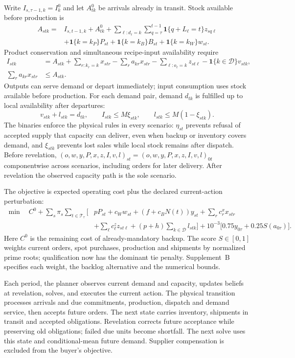 \documentclass[preprint,11pt,authoryear]{elsarticle}
\begin{document}
Write $I_{s,\tau-1,k}=I^0_k$ and let $A^0_{tk}$ be arrivals already in transit. Stock available before production is
\begin{align}
A_{stk}={}&I_{s,t-1,k}+A^0_{tk}
 +\sum_{\ell:d_\ell=k}\sum_{q=\tau}^{t-1}\mathbf1\{q+L_\ell=t\}z_{sq\ell}\nonumber\\
 &+\mathbf1\{k=k_P\}P_{st}+\mathbf1\{k=k_B\}B_{st}+\mathbf1\{k=k_W\}w_{st}.\label{eq:article_arrivals}
\end{align}
Product conservation and simultaneous recipe-input availability require
\begin{align}
I_{stk}&=A_{stk}+\sum_{r:k_r=k}x_{str}-\sum_r a_{kr}x_{str}
 -\sum_{\ell:o_\ell=k}z_{st\ell}-\mathbf1\{k\in\mathcal D\}v_{stk},\label{eq:article_balance}\\
\sum_r a_{kr}x_{str}&\le A_{stk}.\label{eq:article_assembly}
\end{align}
Outputs can serve demand or depart immediately; input consumption uses stock available before production. For each demand pair, demand $d_{tk}$ is fulfilled up to local availability after departures:
\begin{equation}
v_{stk}+l_{stk}=d_{tk},\qquad I_{stk}\le M\xi_{stk},\qquad
l_{stk}\le M(1-\xi_{stk}).\label{eq:article_service}
\end{equation}
The binaries enforce the physical rules in every scenario: $\eta_{st}$ prevents refusal of accepted supply that capacity can deliver, even when backup or inventory covers demand, and $\xi_{stk}$ prevents lost sales while local stock remains after dispatch.
Before revelation, $(o,w,y,P,x,z,I,v,l)_{st}=(o,w,y,P,x,z,I,v,l)_{0t}$ componentwise across scenarios, including orders for later delivery. After revelation the observed capacity path is the sole scenario.

The objective is expected operating cost plus the declared current-action perturbation:
\begin{align}
\min\quad C^0+\sum_s\pi_s\sum_{t\in\mathcal T_\tau}\Big[&pP_{st}+c_Ww_{st}+(f+c_BN(t))y_{st}
 +\sum_r c^x_rx_{str}\nonumber\\
 &+\sum_\ell c^z_\ell z_{st\ell}+(p+h)\sum_{k\in\mathcal D}l_{stk}\Big]
 +10^{-3}\big[0.75y_{0\tau}+0.25S(a_{0\tau})\big].\label{eq:article_objective}
\end{align}
Here $C^0$ is the remaining cost of already-mandatory backup. The score $S\in[0,1]$ weights current orders, spot purchases, production and shipments by normalized prime roots; qualification now has the dominant tie penalty. Supplement~B specifies each weight, the backlog alternative and the numerical bounds.

Each period, the planner observes current demand and capacity, updates beliefs at revelation, solves, and executes the current action. The physical transition processes arrivals and due commitments, production, dispatch and demand service, then accepts future orders. The next state carries inventory, shipments in transit and accepted obligations. Revelation corrects future acceptance while preserving old obligations; failed due units become shortfall. The next solve uses this state and conditional-mean future demand. Supplier compensation is excluded from the buyer's objective.
\endgroup
\end{document}
